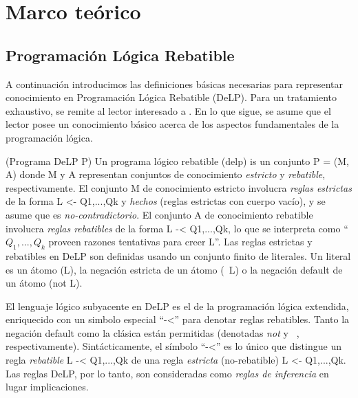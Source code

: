 \section{Marco teórico}

\subsection{Programación Lógica Rebatible}


A continuación introducimos las definiciones básicas necesarias para representar conocimiento
en Programación Lógica Rebatible (DeLP). Para un tratamiento exhaustivo, se remite al lector
interesado a %
. En lo que sigue, se asume que el lector posee un conocimiento básico acerca de los aspectos
fundamentales de la programación lógica.

\begin{definicion}(Programa DeLP P)
	Un programa lógico rebatible (delp) is un conjunto P = (M, A) donde M y A representan conjuntos
	de conocimiento \textit{estricto} y \textit{rebatible}, respectivamente. El conjunto M de 
	conocimiento estricto involucra \textit{reglas estrictas} de la forma L <- Q1,...,Qk y \textit{hechos}
	(reglas estrictas con cuerpo vacío), y se asume que es \textit{no-contradictorio}. El conjunto A 
	de conocimiento rebatible involucra \textit{reglas rebatibles} de la forma L -< Q1,...,Qk, lo que 
	se interpreta como ``$Q_1,...,Q_k$ proveen razones tentativas para creer L''. Las reglas estrictas y
	rebatibles en DeLP son definidas usando un conjunto finito de literales. Un literal es un átomo (L),
	la negación estricta de un átomo (~L) o la negación default de un átomo (not L). %
\end{definicion}

El lenguaje lógico subyacente en DeLP es el de la programación lógica extendida, %
enriquecido con un simbolo especial ``-<'' para denotar reglas rebatibles. Tanto la negación 
default como la clásica están permitidas (denotadas \textit{not} y \textit{~}, respectivamente).
Sintácticamente, el símbolo ``-<'' es lo único que distingue un regla \textit{rebatible} L -< Q1,...,Qk
de una regla \textit{estricta} (no-rebatible) L <- Q1,...,Qk. Las reglas DeLP, por lo tanto, son 
consideradas como \textit{reglas de inferencia} en lugar implicaciones.


